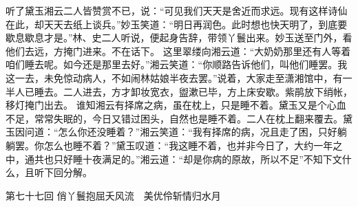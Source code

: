 \documentclass[12pt,oneside]{book}
\begin{document}
听了黛玉湘云二人皆赞赏不已，说：“可见我们天天是舍近而求远。现有这样诗仙在此，却天天去纸上谈兵。”妙玉笑道：“明日再润色。此时想也快天明了，到底要歇息歇息才是。”林、史二人听说，便起身告辞，带领丫鬟出来。妙玉送至门外，看他们去远，方掩门进来。不在话下。
这里翠缕向湘云道：“大奶奶那里还有人等着咱们睡去呢。如今还是那里去好。”湘云笑道：“你顺路告诉他们，叫他们睡罢。我这一去，未免惊动病人，不如闹林姑娘半夜去罢。”说着，大家走至潇湘馆中，有一半人已睡去。二人进去，方才卸妆宽衣，盥漱已毕，方上床安歇。紫鹃放下绡帐，移灯掩门出去。
谁知湘云有择席之病，虽在枕上，只是睡不着。黛玉又是个心血不足，常常失眠的，今日又错过困头，自然也是睡不着。二人在枕上翻来覆去。黛玉因问道：“怎么你还没睡着？”湘云笑道：“我有择席的病，况且走了困，只好躺躺罢。你怎么也睡不着？”黛玉叹道：“我这睡不着，也并非今日了，大约一年之中，通共也只好睡十夜满足的。”湘云道：“却是你病的原故，所以不足”不知下文什么，且听下回分解。
 
第七十七回  俏丫鬟抱屈夭风流　美优伶斩情归水月
\end{document}
